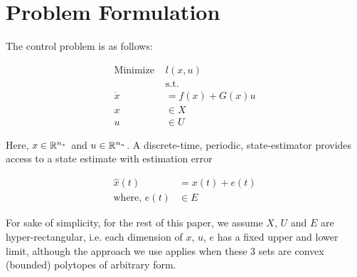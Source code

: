 \section{Problem Formulation} \label{sec:formulation}

The control problem is as follows:

\begin{subequations}
\begin{align}
\text{Minimize } &l(x,u) \\
&\text{s.t.} \nonumber \\
\dot{x}&=f(x)+G(x)u \label{eq:NL_Plant} \\
x&\in X\\
u&\in U
\end{align}
\end{subequations}

Here, $x \in \mathbb{R}^{n_x}$ and $u \in \mathbb{R}^{n_u}$. A discrete-time, periodic, state-estimator provides access to a state estimate with estimation error

\begin{subequations}
\label{eq:NL_estimate}
\begin{align}
\hat{x}(t)&=x(t)+e(t) \\ 
\text{where, } e(t) &\in E
\end{align}
\end{subequations}

For sake of simplicity, for the rest of this paper, we assume $X$, $U$ and $E$ are hyper-rectangular, i.e. each dimension of $x$, $u$, $e$ has a fixed upper and lower limit, although the approach we use applies when these 3 sets are convex (bounded) polytopes of arbitrary form.
